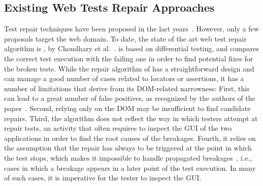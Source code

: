 \subsection{Existing Web Tests Repair Approaches}

Test repair techniques have been proposed in the last years~\cite{Gao:2016:SGT:3046547.3046580,Daniel:2011:AGR:2002931.2002937,Daniel:2009:RSR:1747491.1747538,Daniel:2010:TRU:1831708.1831734,Choudhary:2011:WWA:2002931.2002935,Hammoudi-2016-FSE}. However, only a few proposals target the web domain. To date, the state of the art web test repair algorithm is \water, by Choudhary et al.~\cite{Choudhary:2011:WWA:2002931.2002935}. \water is based on differential testing, and compares the correct test execution with the failing one in order to find potential fixes for the broken tests. While the repair algorithm of \water has a straightforward design and can manage a good number of cases related to locators or assertions, it has a number of limitations that derive from its  DOM-related narrowness: First, this can lead to a great number of false positives, as recognized by the authors of the paper~\cite{Choudhary:2011:WWA:2002931.2002935}. Second, 
 relying only on the DOM may be insufficient to find candidate repairs. Third, the algorithm does not reflect the way in which testers attempt at repair tests, an activity that often requires to inspect the GUI of the two applications in order to find the root causes of the breakages. Fourth, it relies on the assumption that the repair has always to be triggered at the point in which the test stops, which makes it impossible to handle propagated breakages~\cite{Hammoudi-2016-ICST}, i.e., cases in which a breakage appears in a later point of the test execution. In many of such cases, it is imperative for the tester to inspect the GUI.


%
%


